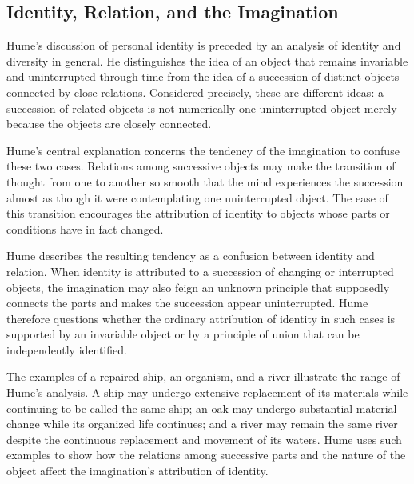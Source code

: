 \subsection{Identity, Relation, and the Imagination}
\label{subsec:ch08-hume-identity-general}

\label{para:VS.B01.P01.C08.S09.SS06.P001}

Hume's discussion of personal identity is preceded
by an analysis of identity and diversity in general.
He distinguishes the idea of an object that remains
invariable and uninterrupted through time from
the idea of a succession of distinct objects
connected by close relations. Considered precisely,
these are different ideas: a succession of related
objects is not numerically one uninterrupted object
merely because the objects are closely connected.
\cite[1.4.6.6--7, SBN 253--255]{HumeTreatise}

\label{para:VS.B01.P01.C08.S09.SS06.P002}

Hume's central explanation concerns the tendency
of the imagination to confuse these two cases.
Relations among successive objects may make the
transition of thought from one to another so smooth
that the mind experiences the succession almost
as though it were contemplating one uninterrupted
object. The ease of this transition encourages
the attribution of identity to objects whose parts
or conditions have in fact changed.
\cite[1.4.6.6--7, SBN 253--255]{HumeTreatise}

\label{para:VS.B01.P01.C08.S09.SS06.P003}

Hume describes the resulting tendency as a confusion
between identity and relation. When identity is
attributed to a succession of changing or interrupted
objects, the imagination may also feign an unknown
principle that supposedly connects the parts and
makes the succession appear uninterrupted. Hume
therefore questions whether the ordinary attribution
of identity in such cases is supported by an
invariable object or by a principle of union that
can be independently identified.
\cite[1.4.6.6--7, SBN 253--255]{HumeTreatise}

\label{para:VS.B01.P01.C08.S09.SS06.P004}

The examples of a repaired ship, an organism, and
a river illustrate the range of Hume's analysis.
A ship may undergo extensive replacement of its
materials while continuing to be called the same
ship; an oak may undergo substantial material change
while its organized life continues; and a river
may remain the same river despite the continuous
replacement and movement of its waters. Hume uses
such examples to show how the relations among
successive parts and the nature of the object
affect the imagination's attribution of identity.
\cite[1.4.6.8--14, SBN 255--258]{HumeTreatise}

